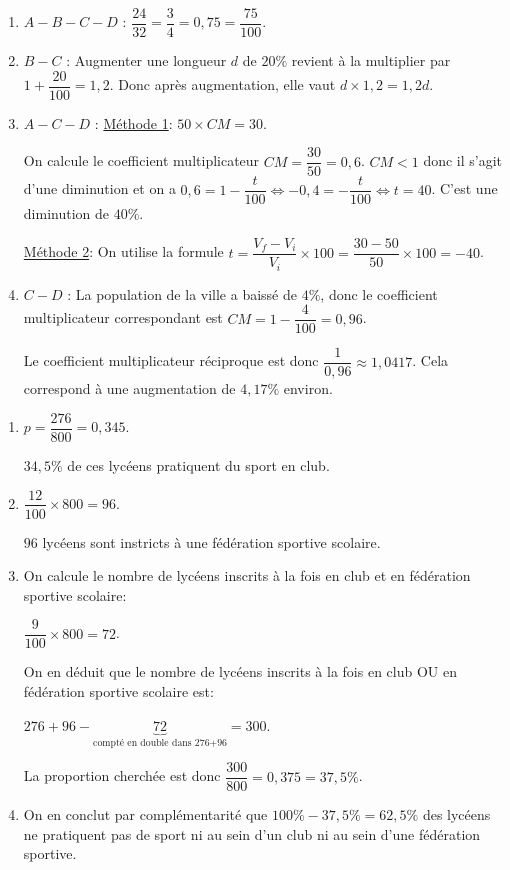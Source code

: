 \documentclass[a4paper]{article}
\begin{document}
    \begin{exercice}{}{}
    \begin{enumerate}
      \item $A-B-C-D$ : $\dfrac{24}{32}=\dfrac{3}{4}=0,75=\dfrac{75}{100}$.
      \item $B-C$ : Augmenter une longueur $d$ de $20\%$ revient à la multiplier par $1+\dfrac{20}{100}=1,2$.
      Donc après augmentation, elle vaut $d\times 1,2=1,2d$.
      \item $A-C-D$ : \underline{Méthode 1}: $50 \times CM = 30$.
        
      On calcule le coefficient multiplicateur $CM=\dfrac{30}{50}=0,6$. $CM<1$ donc il s'agit
      d'une diminution et on a $0,6=1-\dfrac{t}{100} \iff -0,4=-\dfrac{t}{100} \iff t=40$. C'est une diminution de $40\%$.

      \underline{Méthode 2}: On utilise la formule $t=\dfrac{V_f-V_i}{V_i}\times 100=\dfrac{30-50}{50}\times 100 = -40$.

      \item $C-D$ : La population de la ville a baissé de $4\%$, donc le coefficient multiplicateur correspondant est $CM=1-\dfrac{4}{100}=0,96$.
      
      Le coefficient multiplicateur réciproque est donc $\dfrac{1}{0,96}\approx1,0417$. Cela correspond à une augmentation de $4,17\%$ environ.
    \end{enumerate}
    \end{exercice}

    \medskip

    \begin{exercice}{}{}
    \begin{enumerate}
      \item $p=\dfrac{276}{800}=0,345$.

      $34,5\%$ de ces lycéens pratiquent du sport en club.

      \item $\dfrac{12}{100}\times800=96$.
      
      $96$ lycéens sont instricts à une fédération sportive scolaire.

      \item On calcule le nombre de lycéens inscrits à la fois en club et en fédération sportive scolaire:

      $\dfrac{9}{100}\times800=72$.

      On en déduit que le nombre de lycéens inscrits à la fois en club OU en fédération sportive scolaire est:

      $276+96-\underbrace{72}_{\text{compté en double dans 276+96}}=300$.

      La proportion cherchée est donc $\dfrac{300}{800}=0,375=37,5\%$.

      \item On en conclut par complémentarité que $100\%-37,5\%=62,5\%$ des lycéens ne pratiquent pas 
      de sport ni au sein d'un club ni au sein d'une fédération sportive.
    \end{enumerate}
    \end{exercice}
\end{document}
